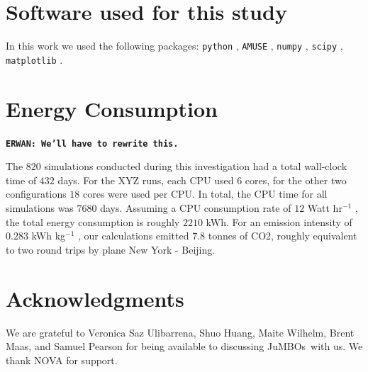\documentclass[submission,phys]{lib/SciPost}
\newcommand{\erwan}[1] {{\texttt{\textbf{ERWAN: #1}}} }
\newcommand{\jumbos}{\mbox{JuMBOs}}
\begin{document}
\section*{Software used for this study}

In this work we used the following packages: \texttt{python}
\cite{10.5555/1593511}, \texttt{AMUSE} \cite{2018araa.book.....P},
\texttt{numpy} \cite{Oliphant2006ANumPy}, \texttt{scipy}
\cite{2020SciPy-NMeth}, \texttt{matplotlib}
\cite{2007CSE.....9...90H}.

\section*{Energy Consumption}

\erwan{We'll have to rewrite this.}

The $820$ simulations conducted during this investigation had a total
wall-clock time of $432$ days. For the XYZ runs, each CPU used $6$
cores, for the other two configurations $18$ cores were used per
CPU. In total, the CPU time for all simulations was $7680$
days. Assuming a CPU consumption rate of $12$ Watt hr$^{-1}$
\cite{2020NatAs...4..819P}, the total energy consumption is roughly
$2210$ kWh. For an emission intensity of $0.283$ kWh kg$^{-1}$
\cite{doi:10.1002/cpe.3489}, our calculations emitted $7.8$ tonnes of
CO2, roughly equivalent to two round trips by plane New York -
Beijing.

\section*{Acknowledgments}
We are grateful to Veronica Saz Ulibarrena, Shuo Huang, Maite Wilhelm,
Brent Maas, and Samuel Pearson for being available to discussing
\jumbos\, with us.
We thank NOVA for support.


%
\end{document}
